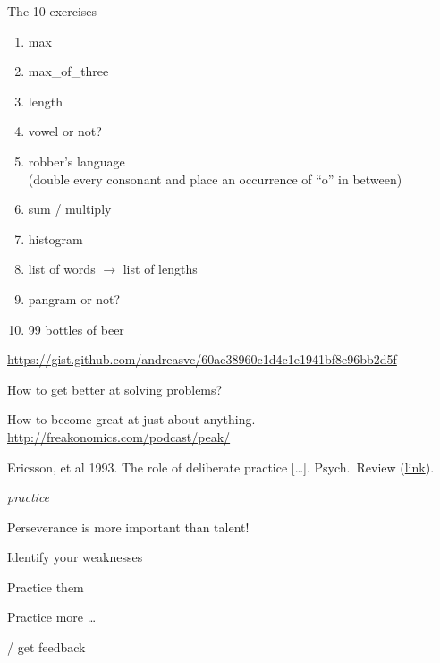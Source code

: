 \documentclass[aspectratio=169,usenames,dvipsnames]{beamer}
\begin{document}
\begin{frame}{The 10 exercises}
    \begin{enumerate}
        \item max
        \item max\_of\_three
        \item length
        \item vowel or not?
        \item robber's language \\
            (double every consonant and place an occurrence of ``o'' in between)
        \item sum / multiply
        \item histogram
        \item list of words $\rightarrow$ list of lengths
        \item pangram or not?
        \item 99 bottles of beer
    \end{enumerate}
    \url{https://gist.github.com/andreasvc/60ae38960c1d4c1e1941bf8e96bb2d5f}
\end{frame}

\begin{frame}{How to get better at solving problems?}
    \begin{reference}
        How to become great at just about anything. \url{http://freakonomics.com/podcast/peak/}

        Ericsson, et al 1993. The role of deliberate practice [\dots]. Psych.\ Review
        (\href{http://graphics8.nytimes.com/images/blogs/freakonomics/pdf/DeliberatePractice(PsychologicalReview).pdf}{link}).
    \end{reference}
    {\centering\Huge\em
     practice}

    \pause\vspace{3em}
    Perseverance is more important than talent!

    \begin{description}[Dedication:]
        \item[Planning:] Identify your weaknesses
        \item[Dedication:] Practice them
        \item[Repetition:] Practice more \dots
        \item[Reflect] / get feedback
    \end{description}


\end{frame}
\end{document}
